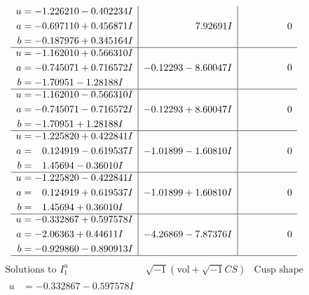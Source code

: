 \documentclass[1p]{elsarticle_modified}
\theoremstyle{definition}
\newcommand{\I}{\sqrt{-1}}
\begin{document}
$$\begin{array}{c|c|c}
\begin{aligned}
u &= -1.226210 - 0.402234 I \\
a &= -0.697110 + 0.456871 I \\
b &= -0.187976 + 0.345164 I\end{aligned}
 & \phantom{-0.000000 -}7.92691 I & \phantom{-0.000000 } 0 \\ \hline\begin{aligned}
u &= -1.162010 + 0.566310 I \\
a &= -0.745071 + 0.716572 I \\
b &= -1.70951 - 1.28188 I\end{aligned}
 & -0.12293 - 8.60047 I & \phantom{-0.000000 } 0 \\ \hline\begin{aligned}
u &= -1.162010 - 0.566310 I \\
a &= -0.745071 - 0.716572 I \\
b &= -1.70951 + 1.28188 I\end{aligned}
 & -0.12293 + 8.60047 I & \phantom{-0.000000 } 0 \\ \hline\begin{aligned}
u &= -1.225820 + 0.422841 I \\
a &= \phantom{-}0.124919 - 0.619537 I \\
b &= \phantom{-}1.45694 - 0.36010 I\end{aligned}
 & -1.01899 - 1.60810 I & \phantom{-0.000000 } 0 \\ \hline\begin{aligned}
u &= -1.225820 - 0.422841 I \\
a &= \phantom{-}0.124919 + 0.619537 I \\
b &= \phantom{-}1.45694 + 0.36010 I\end{aligned}
 & -1.01899 + 1.60810 I & \phantom{-0.000000 } 0 \\ \hline\begin{aligned}
u &= -0.332867 + 0.597578 I \\
a &= -2.06363 + 0.44611 I \\
b &= -0.929860 - 0.890913 I\end{aligned}
 & -4.26869 - 7.87376 I & \phantom{-0.000000 } 0\\
 \hline 
 \end{array}$$\newpage$$\begin{array}{c|c|c}  
\text{Solutions to }I^u_{1}& \I (\text{vol} + \sqrt{-1}CS) & \text{Cusp shape}\\
 \hline 
\begin{aligned}
u &= -0.332867 - 0.597578 I \\

\end{aligned}
\end{array}$$
\end{document}
